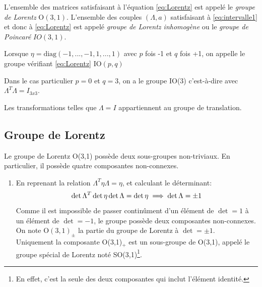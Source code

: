 {L'ensemble des matrices satisfaisant à l'équation \ref{eq:Lorentz} est appelé le \textit{groupe de Lorentz} O$(3,1)$. L'ensemble des couples $(\Lambda,a)$ satisfaisant à \ref{eq:intervalle1} et donc à \ref{eq:Lorentz} est appelé \textit{groupe de Lorentz inhomogène} ou le \textit{groupe de Poincaré} $IO(3,1)$. 

\begin{rmk}
Lorsque $\eta = \text{diag}(-1,...,-1,1,...,1)$ avec $p$ fois -1 et $q$ fois +1, on appelle le groupe vérifiant \ref{eq:Lorentz} IO$(p,q)$
    
\end{rmk}
\begin{rmk}
    Dans le cas particulier $p =0$ et $q=3$, on a le groupe IO(3) c'est-à-dire avec $\Lambda ^{T} \Lambda = I_{3x3}$. 
\end{rmk}

Les transformations telles que $\Lambda =  I$ appartiennent au groupe de translation.

\subsection{Groupe de Lorentz}

Le groupe de Lorentz O(3,1) possède deux sous-groupes non-triviaux. En particulier, il possède quatre composantes non-connexes.

\begin{enumerate}
    \item En reprenant la relation $\Lambda ^{T} \eta \Lambda = \eta$, et calculant le déterminant:
    \begin{equation}
        \det \Lambda^{T} \det \eta \det\Lambda = \det \eta \\
        \implies \det\Lambda = \pm 1
    \end{equation}
    Comme il est impossible de passer continûment d'un élément de $\det =1$ à un élément de $\det = -1$, le groupe possède deux composantes non-connexes. On note O$(3,1)_\pm$ la partie du groupe de Lorentz à $\det = \pm 1$.\\
    Uniquement la composante O(3,1)$_+$ est un sous-groupe de O(3,1), appelé le groupe spécial de Lorentz noté SO(3,1)\footnote{En effet, c'est la seule des deux composantes qui inclut l'élément identité.}. \\


\end{enumerate}}
